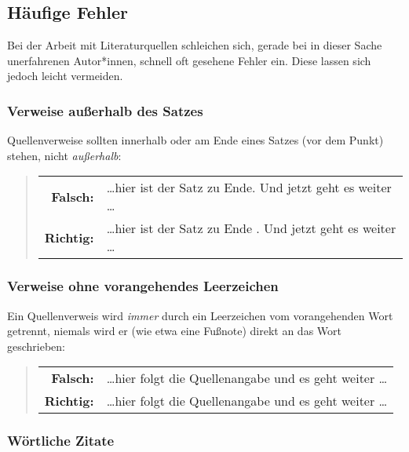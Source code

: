 \subsection{Häufige Fehler}

Bei der Arbeit mit Literaturquellen schleichen sich, gerade bei in dieser Sache
unerfahrenen Autor*innen, schnell oft gesehene Fehler ein. Diese lassen sich jedoch
leicht vermeiden.

\subsubsection{Verweise außerhalb des Satzes}

Quellenverweise sollten innerhalb oder am Ende eines Satzes (\dah vor dem
Punkt) stehen, nicht \emph{außerhalb}:
%
\begin{quote}
    \begin{tabular}{rl}
        \textbf{Falsch:}  & \ldots hier ist der Satz zu Ende.
        \cite{Oetiker2021} Und jetzt geht es weiter \ldots \\
        \textbf{Richtig:} & \ldots hier ist der Satz zu Ende
        \cite{Oetiker2021}. Und jetzt geht es weiter \ldots
    \end{tabular}
\end{quote}

\subsubsection{Verweise ohne vorangehendes Leerzeichen}

Ein Quellenverweis wird \emph{immer} durch ein Leerzeichen vom vorangehenden
Wort getrennt, niemals wird er (wie etwa eine Fußnote) direkt an das Wort
geschrieben:
%
\begin{quote}
    \begin{tabular}{rl}
        \textbf{Falsch:}  & \ldots hier folgt die
        Quellenangabe\cite{Oetiker2021} und es geht weiter \ldots  \\
        \textbf{Richtig:} & \ldots hier folgt die Quellenangabe
        \cite{Oetiker2021} und es geht weiter \ldots
    \end{tabular}
\end{quote}


\subsubsection{Wörtliche Zitate}

